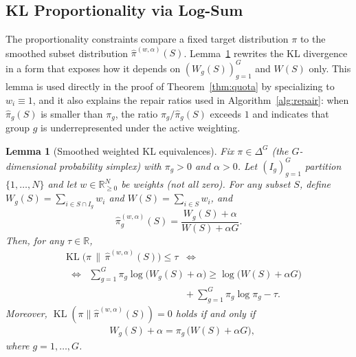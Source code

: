 \documentclass[10pt,journal]{IEEEtran}
\newcommand{\1}{\mathbf{1}}
\DeclareMathOperator{\KL}{KL}
\theoremstyle{ieeethm}
\newtheorem{lemma}{Lemma}
\begin{document}
\subsection{KL Proportionality via Log-Sum}
\label{subsec:quota_path}

The proportionality constraints compare a fixed target distribution $\pi$ to the smoothed subset distribution
$\hat\pi^{(w,\alpha)}(S)$. Lemma~\ref{thm:kl_feasibility} rewrites the KL divergence in a form that exposes how it
depends on $(W_g(S))_{g=1}^G$ and $W(S)$ only. This lemma is used directly in the proof of
Theorem~\ref{thm:quota} by specializing to $w_i\equiv 1$, and it also explains the repair ratios used in
Algorithm~\ref{alg:repair}: when $\hat\pi_g(S)$ is smaller than $\pi_g$, the ratio $\pi_g/\hat\pi_g(S)$ exceeds $1$
and indicates that group $g$ is underrepresented under the active weighting.

\begin{lemma}[Smoothed weighted KL equivalences]
\label{thm:kl_feasibility}
Fix $\pi\in\Delta^G$ (the $G$-dimensional probability simplex) with $\pi_g>0$ and $\alpha>0$. Let $(I_g)_{g=1}^G$ partition $\{1,\dots,N\}$ and let
$w\in\mathbb{R}^N_{\ge 0}$ be weights (not all zero). For any subset $S$, define
$W_g(S)=\sum_{i\in S\cap I_g} w_i$ and $W(S)=\sum_{i\in S} w_i$, and
\[
\hat\pi^{(w,\alpha)}_g(S)=\frac{W_g(S)+\alpha}{W(S)+\alpha G}.
\]
Then, for any $\tau\in\mathbb{R}$,
\begin{equation}
\label{eq:kl_prod_ineq_equiv_alg}
\begin{aligned}
&\KL\!\big(\pi \,\big\|\, \hat\pi^{(w,\alpha)}(S)\big) \le \tau \mspace{10mu}
\Longleftrightarrow\\
&\mspace{10mu} \Longleftrightarrow \mspace{10mu} \sum_{g=1}^G \pi_g \log\!\big(W_g(S)+\alpha\big) \ge
\log\!\big(W(S)+\alpha G\big)\\
&\mspace{226mu}+ \sum_{g=1}^G \pi_g\log \pi_g - \tau.
\end{aligned}
\end{equation}
Moreover, $\KL(\pi\|\hat\pi^{(w,\alpha)}(S))=0$ holds if and only if
\begin{equation}
\label{eq:smoothed_proportionality_alg}
\begin{aligned}
&W_g(S)+\alpha=\pi_g\,\big(W(S)+\alpha G\big),
\end{aligned}
\end{equation}
where $g=1,\dots,G$.
\end{lemma}
\end{document}
